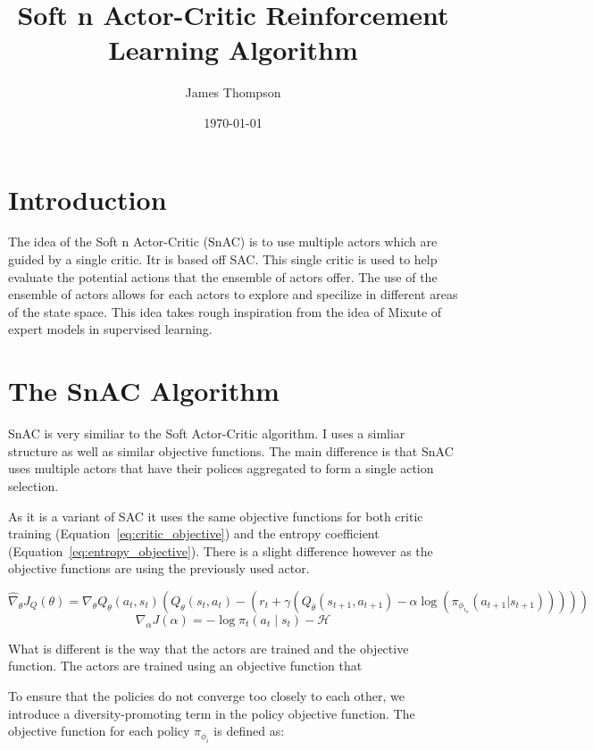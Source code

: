 \documentclass[12pt]{article}
\title{Soft n Actor-Critic Reinforcement Learning Algorithm}
\author{James Thompson}
\date{\today}
\begin{document}
\maketitle

\section{Introduction}
The idea of the Soft n Actor-Critic (SnAC) is to use multiple actors which are guided by a single critic. Itr is based off SAC. This single critic is used to help evaluate the potential actions that the ensemble of actors offer. The use of the ensemble of actors allows for each actors to explore and specilize in different areas of the state space. This idea takes rough inspiration from the idea of Mixute of expert models in supervised learning.

\section{The SnAC Algorithm}

SnAC is very similiar to the Soft Actor-Critic algorithm. I uses a simliar structure as well as similar objective functions. The main difference is that SnAC uses multiple actors that have their polices aggregated to form a single action selection.

As it is a variant of SAC it uses the same objective functions for both critic training (Equation~\ref{eq:critic_objective}) and the entropy coefficient (Equation~\ref{eq:entropy_objective}). There is a slight difference however as the objective functions are using the previously used actor.

\begin{equation}
\label{eq:critic_objective}
\hat{\nabla}_{\theta} J_Q(\theta) = \nabla_{\theta} Q_{\theta}(a_t, s_t) \left(Q_{\theta}(s_t, a_t) - \left(r_{t} + \gamma \left(Q_{\bar{\theta}}(s_{t+1}, a_{t+1}) - \alpha \log \left(\pi_{\phi_{i_\pi}}(a_{t+1} | s_{t+1})\right)\right)\right)\right)
\end{equation}
\begin{equation}
\label{eq:entropy_objective}
\nabla_{\alpha} J(\alpha) = -\log \pi_t(a_t \mid s_t) - \mathcal{H}
\end{equation}

What is different is the way that the actors are trained and the objective function. The actors are trained using an objective function that 

To ensure that the policies do not converge too closely to each other, we introduce a diversity-promoting term in the policy objective function. The objective function for each policy $\pi_{\phi_i}$ is defined as:
\end{document}
